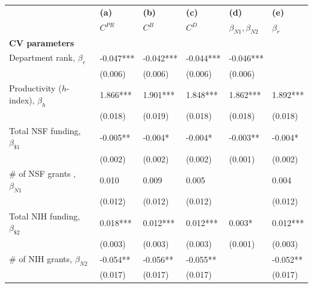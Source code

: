 \documentclass[10pt]{article}          %
\begin{document}
\begin{table}[h]
\begin{tabular}{m{5cm} p{2.1cm} p{2.1cm} p{2.1cm} p{2.1cm} p{2.1cm} }
\hline
\hline
& \textbf{(a)} & \textbf{(b)} & \textbf{(c)} & \textbf{(d)} & \textbf{(e)} \\
& {$C^{PR}$} & {$C^{B}$} & {$C^{D}$} & \sout{$\beta_{N1}, \beta_{N2}$} & \sout{$\beta_{r}$} \\ \hline

\multicolumn{6}{l}{\textbf{CV parameters}} \\
\rowcolor{lightgray}
{Department rank, $\beta_r$}          & -0.047*** & -0.042*** & -0.044*** & -0.046*** &           \\
                                      & (0.006)   & (0.006)   & (0.006)   & (0.006)   &           \\
\rowcolor{lightgray}                               
{Productivity ($h$-index), $\beta_h$} & 1.866***  & 1.901***  & 1.848***  & 1.862***  & 1.892***  \\
                                      & (0.018)   & (0.019)   & (0.018)   & (0.018)   & (0.018)   \\
\rowcolor{lightgray}
{Total NSF funding, $\beta_{\$1}$}    & -0.005**  & -0.004*   & -0.004*   & -0.003**  & -0.004*   \\
                                      & (0.002)   & (0.002)   & (0.002)   & (0.001)   & (0.002)   \\
\rowcolor{lightgray}
{\# of NSF grants , $\beta_{N1}$}     & 0.010     & 0.009     & 0.005     &           & 0.004     \\
                                      & (0.012)   & (0.012)   & (0.012)   &           & (0.012)   \\
\rowcolor{lightgray}
{Total NIH funding, $\beta_{\$2}$}    & 0.018***  & 0.012***  & 0.012***  & 0.003*    & 0.012***  \\
                                      & (0.003)   & (0.003)   & (0.003)   & (0.001)   & (0.003)   \\
\rowcolor{lightgray}
{\# of NIH grants, $\beta_{N2}$}      & -0.054**  & -0.056**  & -0.055**  &           & -0.052**  \\
                                      & (0.017)   & (0.017)   & (0.017)   &           & (0.017)   \\ \hline


\end{tabular}
\end{table}
\end{document}
